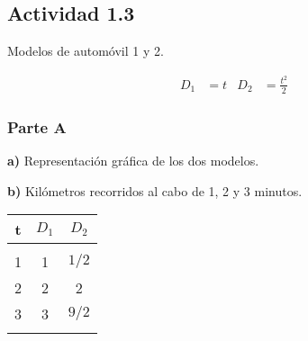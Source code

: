 \subsection*{Actividad 1.3}

Modelos de automóvil 1 y 2.

\begin{align*}
    D_1 & = t             &
    D_2 & = \frac{t^2}{2}
\end{align*}

\subsubsection*{Parte A}

\textbf{a)} Representación gráfica de los dos modelos.

\begin{center}
\end{center}

\textbf{b)} Kilómetros recorridos al cabo de 1, 2 y 3 minutos.

\begin{center}
    \begin{tabular}{ c c c }
        t      & $D_1$ & $D_2$ \\
        \hline &               \\ [-1em]
        1      & 1     & $1/2$ \\
        2      & 2     & 2     \\
        3      & 3     & $9/2$ \\
        \hline
        \vspace{12pt}
    \end{tabular}
\end{center}

